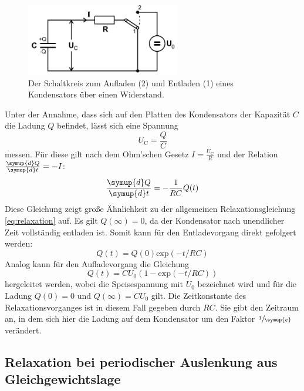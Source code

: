     \begin{figure}[H]
        \centering
        \includegraphics[width=0.6\textwidth]{bilder/Auflade_und_entlade.PNG}
        \caption{Der Schaltkreis zum Aufladen (2) und Entladen (1) eines Kondensators über einen Widerstand.\cite{anleitung}}
        \label{fig:Auf_Entladen}
    \end{figure}

    \noindent
    Unter der Annahme, dass sich auf den Platten des Kondensators der Kapazität $C$ die Ladung $Q$ befindet, lässt sich eine Spannung 
    \begin{equation*}
        U_{\text{C}} = \frac{Q}{C}
    \end{equation*}
    messen. Für diese gilt nach dem Ohm'schen Gesetz $I = \frac{U_{\text{C}}}{R}$ und der Relation $\frac{\symup{d}Q}{\symup{d}t} = -I$:
    \begin{equation*}
        \frac{\symup{d}Q}{\symup{d}t}  = - \frac{1}{RC} Q(t)
    \end{equation*}
    Diese Gleichung zeigt große Ähnlichkeit zu der allgemeinen Relaxationsgleichung \eqref{eq:relaxation} auf. Es gilt $Q(\infty) = 0$, da der Kondensator nach 
    unendlicher Zeit vollständig entladen ist. Somit kann für den Entladevorgang direkt gefolgert werden:
    \begin{equation}
        \label{eqn:AufgabeA}
        Q(t) = Q(0) \text{exp}(-t/RC)
    \end{equation}
    Analog kann für den Aufladevorgang die Gleichung
    \begin{equation*}
        Q(t) = CU_0(1- \text{exp}(-t/RC))
    \end{equation*}
    hergeleitet werden, wobei die Speisespannung mit $U_0$ bezeichnet wird und für die Ladung $Q(0)= 0 $ und $Q(\infty) = CU_0 $ gilt.
    Die Zeitkonstante des Relaxationsvorganges ist in diesem Fall gegeben durch $RC$. Sie gibt den Zeitraum an, in dem sich hier die Ladung auf dem Kondensator 
    um den Faktor $\sfrac{1}{\symup{e}}$ verändert.

\subsection{Relaxation bei periodischer Auslenkung aus Gleichgewichtslage}

